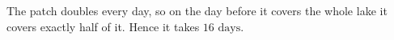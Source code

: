 The patch doubles every day, so on the day before it covers the whole lake it covers exactly half of it. Hence it takes $\boxed{16\text{ days}}$.
